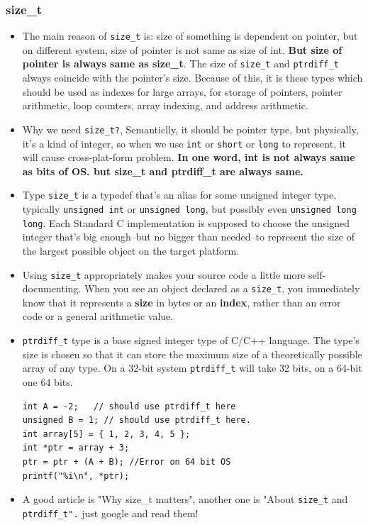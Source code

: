 \documentclass[a4paper,11pt,twoside]{book}
\begin{document}
\subsubsection{size\_t}
\begin{itemize}
	\item The main reason of \texttt{size\_t} is: size of something is dependent on pointer, but on different system, size of pointer is not same as size of int.  \textbf{But size of pointer is always same as size\_t}. The size of \texttt{size\_t} and \texttt{ptrdiff\_t} always coincide with the pointer's size. Because of this, it is these types which should be used as indexes for large arrays, for storage of pointers, pointer arithmetic, loop counters, array indexing, and address arithmetic.

	\item Why we need \texttt{size\_t?}, Semanticlly, it should be pointer type, but physically, it's a kind of integer, so when we use \texttt{int} or \texttt{short} or \texttt{long} to represent, it will cause cross-plat-form problem. \textbf{In one word, int is not always same as bits of OS. but size\_t and ptrdiff\_t are always same.}

	\item Type \texttt{size\_t} is a typedef that's an alias for some unsigned integer type, typically \texttt{unsigned int} or \texttt{unsigned long}, but possibly even \texttt{unsigned long long}. Each Standard C implementation is supposed to choose the unsigned integer that's big enough--but no bigger than needed--to represent the size of the largest possible object on the target platform.
	
	\item Using \texttt{size\_t} appropriately makes your source code a little more self-documenting. When you see an object declared as a \texttt{size\_t}, you immediately know that it represents a \textbf{size} in bytes or an \textbf{index}, rather than an error code or a general arithmetic value.
	
	\item \texttt{ptrdiff\_t} type is a base signed integer type of C/C++ language. The type's size is chosen so that it can store the maximum size of a theoretically possible array of any type. On a 32-bit system \texttt{ptrdiff\_t} will take 32 bits, on a 64-bit one 64 bits.
\begin{lstlisting}[numbers=none]
int A = -2;   // should use ptrdiff_t here
unsigned B = 1; // should use ptrdiff_t here.
int array[5] = { 1, 2, 3, 4, 5 };
int *ptr = array + 3;
ptr = ptr + (A + B); //Error on 64 bit OS
printf("%i\n", *ptr);
\end{lstlisting}
	
	\item A good article is "Why size\_t matters", another one is "About \texttt{size\_t} and \texttt{ptrdiff\_t".} just google and read them!   
\end{itemize}
\end{document}
